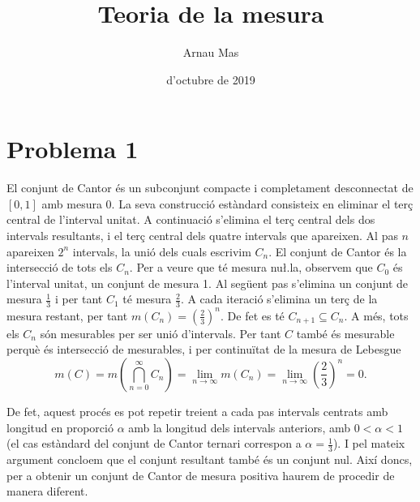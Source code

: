 \documentclass[12pt]{article}
\title{\sffamily {\bfseries Entrega 1:} Teoria de la mesura}
\author{\sffamily Arnau Mas}
\date{\sffamily 18 d'octubre de 2019}
\begin{document}
\maketitle

\section*{Problema 1}
El conjunt de Cantor és un subconjunt compacte i completament desconnectat de \( [0,1] \) amb
mesura 0. La seva construcció estàndard consisteix en eliminar el terç central de
l'interval unitat. A continuació s'elimina el terç central dels dos intervals resultants,
i el terç central dels quatre intervals que apareixen. Al pas \( n \) apareixen \( 2^n \)
intervals, la unió dels cuals escrivim \( C_n \). El conjunt de Cantor és la
intersecció de tots els \( C_n \). Per a veure que té mesura nu\l.la, observem que \( C_0
\) és l'interval unitat, un conjunt de mesura 1. Al següent pas s'elimina un conjunt de
mesura \( \frac{1}{3} \) i per tant \( C_1 \) té mesura \( \frac{2}{3} \). A cada iteració
s'elimina un terç de la mesura restant, per tant \( m(C_n) = \left(\frac{2}{3}\right)^n
\). De fet es té \( C_{n+1} \subseteq C_n \). A més, tots els \( C_n \) són mesurables per
ser unió d'intervals. Per tant \( C \) també és mesurable perquè és intersecció de mesurables, i
per continuïtat de la mesura de Lebesgue
\begin{equation*}
	m(C) = m\left(\bigcap_{n = 0}^{\infty} C_n\right) = \lim_{n \to \infty} m(C_n) = \lim_{n \to
	\infty} \left(\frac{2}{3}\right)^n = 0. 
\end{equation*}

De fet, aquest procés es pot repetir treient a cada pas intervals centrats amb longitud
en proporció \( \alpha \) amb la longitud dels intervals anteriors, amb \( 0 < \alpha < 1
\) (el cas estàndard del conjunt de Cantor ternari correspon a \( \alpha = \frac{1}{3}
\)). I pel mateix argument concloem que el conjunt resultant també és un conjunt nul. Així
doncs, per a obtenir un conjunt de Cantor de mesura positiva haurem de procedir de manera
diferent. 
\end{document}

